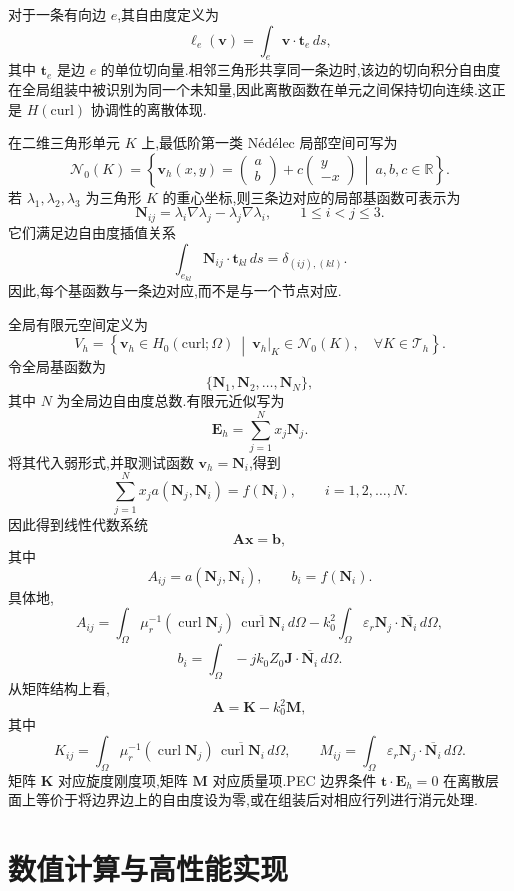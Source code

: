 \documentclass[12pt,hyperref,a4paper,UTF8,twoside]{ctexart}
\newcommand{\curl}{\operatorname{curl}}
\newcommand{\E}{\bm{E}}
\newcommand{\J}{\bm{J}}
\newcommand{\tvec}{\bm{t}}
\newcommand{\R}{\mathbb{R}}
\begin{document}
对于一条有向边 $e$,其自由度定义为
\[
\ell_e(\bm{v})
=
\int_e \bm{v}\cdot\tvec_e\,ds,
\]
其中 $\tvec_e$ 是边 $e$ 的单位切向量.相邻三角形共享同一条边时,该边的切向积分自由度在全局组装中被识别为同一个未知量,因此离散函数在单元之间保持切向连续.这正是 $H(\text{curl})$ 协调性的离散体现.

在二维三角形单元 $K$ 上,最低阶第一类 Nédélec 局部空间可写为
\[
\mathcal{N}_0(K)
=
\left\{
\bm{v}_h(x,y)
=
\begin{pmatrix}
a\\ b
\end{pmatrix}
+
c
\begin{pmatrix}
y\\ -x
\end{pmatrix}
\ \middle|\
a,b,c\in\R
\right\}.
\]
若 $\lambda_1,\lambda_2,\lambda_3$ 为三角形 $K$ 的重心坐标,则三条边对应的局部基函数可表示为
\[
\bm{N}_{ij}
=
\lambda_i\nabla\lambda_j
-
\lambda_j\nabla\lambda_i,
\qquad 1\le i<j\le 3.
\]
它们满足边自由度插值关系
\[
\int_{e_{kl}}
\bm{N}_{ij}\cdot\tvec_{kl}\,ds
=
\delta_{(ij),(kl)}.
\]
因此,每个基函数与一条边对应,而不是与一个节点对应.

全局有限元空间定义为
\[
V_h=
\left\{
\bm{v}_h\in H_0(\text{curl};\Omega)
\ \middle|\
\bm{v}_h|_K\in\mathcal{N}_0(K),
\quad
\forall K\in\mathcal{T}_h
\right\}.
\]
令全局基函数为
\[
\{\bm{N}_1,\bm{N}_2,\ldots,\bm{N}_N\},
\]
其中 $N$ 为全局边自由度总数.有限元近似写为
\[
\E_h=\sum_{j=1}^{N}x_j\bm{N}_j.
\]
将其代入弱形式,并取测试函数 $\bm{v}_h=\bm{N}_i$,得到
\[
\sum_{j=1}^{N}x_j a(\bm{N}_j,\bm{N}_i)=f(\bm{N}_i),
\qquad i=1,2,\ldots,N.
\]
因此得到线性代数系统
\[
\bm{A}\bm{x}=\bm{b},
\]
其中
\[
A_{ij}=a(\bm{N}_j,\bm{N}_i),
\qquad
b_i=f(\bm{N}_i).
\]
具体地,
\[
A_{ij}
=
\int_\Omega
\mu_r^{-1}
(\curl\bm{N}_j)\,\overline{\curl\bm{N}_i}\,d\Omega
-
k_0^2
\int_\Omega
\varepsilon_r
\bm{N}_j\cdot\overline{\bm{N}_i}\,d\Omega,
\]
\[
b_i
=
\int_\Omega
-jk_0Z_0
\J\cdot\overline{\bm{N}_i}\,d\Omega.
\]
从矩阵结构上看,
\[
\bm{A}=\bm{K}-k_0^2\bm{M},
\]
其中
\[
K_{ij}
=
\int_\Omega
\mu_r^{-1}
(\curl\bm{N}_j)\,\overline{\curl\bm{N}_i}\,d\Omega,
\qquad
M_{ij}
=
\int_\Omega
\varepsilon_r
\bm{N}_j\cdot\overline{\bm{N}_i}\,d\Omega.
\]
矩阵 $\bm{K}$ 对应旋度刚度项,矩阵 $\bm{M}$ 对应质量项.PEC 边界条件 $\tvec\cdot\E_h=0$ 在离散层面上等价于将边界边上的自由度设为零,或在组装后对相应行列进行消元处理.

\section{数值计算与高性能实现}
\end{document}
